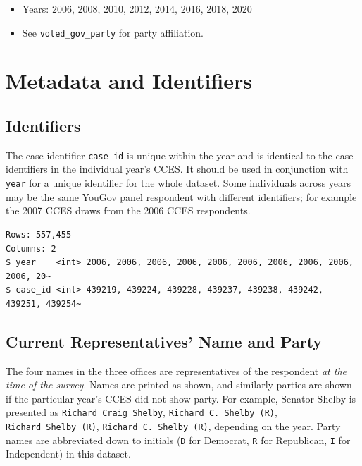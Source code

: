 \documentclass[10pt,article,oneside]{memoir}
\theoremstyle{definition}
\begin{document}
\begin{itemize}
\tightlist
\item
  Years: 2006, 2008, 2010, 2012, 2014, 2016, 2018, 2020
\item
  See \texttt{voted\_gov\_party} for party affiliation.
\end{itemize}

\newpage

\hypertarget{metadata-and-identifiers}{%
\section{Metadata and Identifiers}\label{metadata-and-identifiers}}

\hypertarget{identifiers}{%
\subsection{Identifiers}\label{identifiers}}

The case identifier \texttt{case\_id} is unique within the year and is
identical to the case identifiers in the individual year's CCES. It
should be used in conjunction with \texttt{year} for a unique identifier
for the whole dataset. Some individuals across years may be the same
YouGov panel respondent with different identifiers; for example the 2007
CCES draws from the 2006 CCES respondents.

\begin{verbatim}
Rows: 557,455
Columns: 2
$ year    <int> 2006, 2006, 2006, 2006, 2006, 2006, 2006, 2006, 2006, 2006, 20~
$ case_id <int> 439219, 439224, 439228, 439237, 439238, 439242, 439251, 439254~
\end{verbatim}

\hypertarget{current-representatives-name-and-party}{%
\subsection{Current Representatives' Name and
Party}\label{current-representatives-name-and-party}}

The four names in the three offices are representatives of the
respondent \emph{at the time of the survey}. Names are printed as shown,
and similarly parties are shown if the particular year's CCES did not
show party. For example, Senator Shelby is presented as
\texttt{Richard\ Craig\ Shelby}, \texttt{Richard\ C.\ Shelby\ (R)},
\texttt{Richard\ Shelby\ (R)}, \texttt{Richard\ C.\ Shelby\ (R)},
depending on the year. Party names are abbreviated down to initials
(\texttt{D} for Democrat, \texttt{R} for Republican, \texttt{I} for
Independent) in this dataset.
\end{document}
